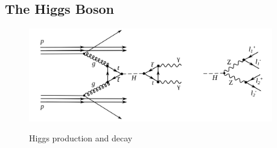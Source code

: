 \subsection{The Higgs Boson}
\label{Intro_Higgs}


\begin{figure}[htb]
  \begin{center}
    {\includegraphics[width=0.95\textwidth]{../figs/Intro/FeynmanHiggs.png}}
    \caption{Higgs production and decay}
    \label{fig:higgsProduction}
  \end{center}
\end{figure}










